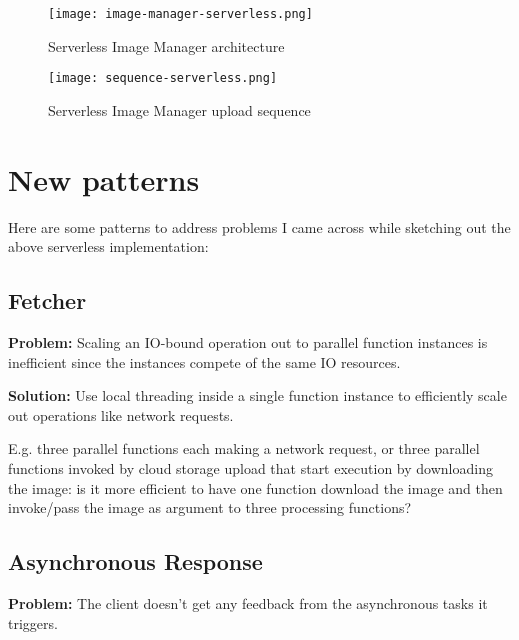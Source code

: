 
\begin{figure}[h]
  \centering
  \texttt{[image: image-manager-serverless.png]}
  \caption{Serverless Image Manager architecture}
  \label{fig:serverlessArchitecture}
\end{figure}

\begin{figure}[h]
  \centering
  \texttt{[image: sequence-serverless.png]}
  \caption{Serverless Image Manager upload sequence}
  \label{fig:serverlessSequence}
\end{figure}

\section{New patterns} \label{sec:newPatterns}

Here are some patterns to address problems I came across while sketching out the above serverless implementation:

\subsection{Fetcher} \label{subsec:Fetcher}

\textbf{Problem:} Scaling an IO-bound operation out to parallel function instances is inefficient since the instances compete of the same IO resources.

\textbf{Solution:} Use local threading inside a single function instance to efficiently scale out operations like network requests.

E.g. three parallel functions each making a network request, or three parallel functions invoked by cloud storage upload that start execution by downloading the image: is it more efficient to have one function download the image and then invoke/pass the image as argument to three processing functions?

\subsection{Asynchronous Response} \label{subsec:AsyncResponse}

\textbf{Problem:} The client doesn't get any feedback from the asynchronous tasks it triggers.

